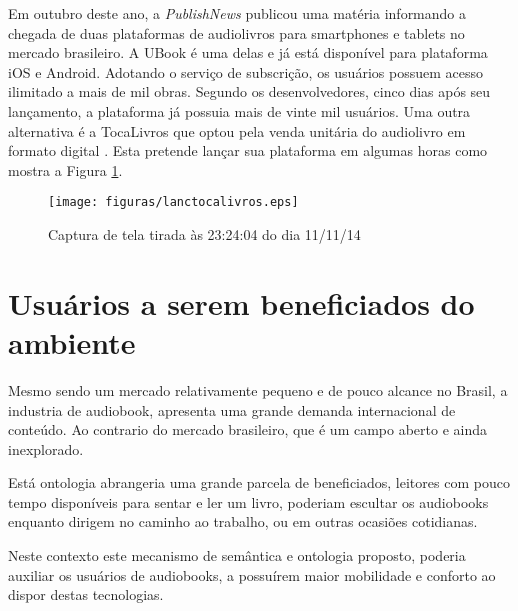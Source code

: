 Em outubro deste ano, a \textit{PublishNews} publicou uma matéria informando a chegada de duas plataformas de audiolivros para smartphones e tablets no mercado brasileiro. A UBook é uma delas e já está disponível para plataforma iOS e Android. Adotando o serviço de subscrição, os usuários possuem acesso ilimitado a mais de mil obras. Segundo os desenvolvedores, cinco dias após seu lançamento, a plataforma já possuia mais de vinte mil usuários. Uma outra alternativa é a TocaLivros que optou pela venda unitária do audiolivro em formato digital \cite{publishnews}. Esta pretende lançar sua plataforma em algumas horas como mostra a Figura \ref{lanctocalivros}.

 \begin{figure}[ht]
	\centering
		\texttt{[image: figuras/lanctocalivros.eps]}
	\caption{Captura de tela tirada às 23:24:04 do dia 11/11/14 \cite{tocalivros}}
	\label{lanctocalivros}
\end{figure}


\section{Usuários a serem beneficiados do ambiente}

Mesmo sendo um mercado relativamente pequeno e de pouco alcance no Brasil, a industria de audiobook, apresenta uma grande demanda internacional de conteúdo. Ao contrario do mercado brasileiro, que é um campo aberto e ainda inexplorado.

Está ontologia abrangeria uma grande parcela de beneficiados, leitores com pouco tempo disponíveis para sentar e ler um livro, poderiam escultar os audiobooks enquanto dirigem no caminho ao trabalho, ou em outras ocasiões cotidianas. 

Neste contexto este mecanismo de semântica e ontologia proposto, poderia auxiliar os usuários de audiobooks, a possuírem maior mobilidade e conforto ao dispor destas tecnologias.
%
%
%
%
%


